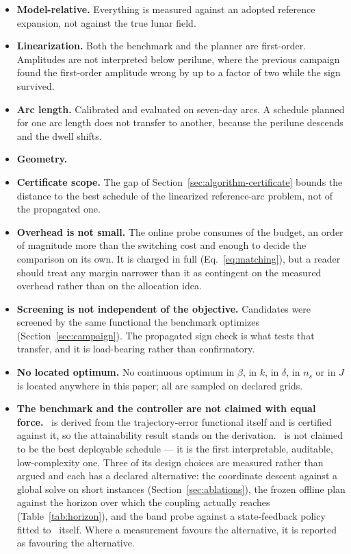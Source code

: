 \begin{itemize}
  \item \textbf{Model-relative.} Everything is measured against an adopted
    reference expansion, not against the true lunar field.
  \item \textbf{Linearization.} Both the benchmark and the planner are
    first-order. Amplitudes are not interpreted below  perilune, where
    the previous campaign found the first-order amplitude wrong by up to a
    factor of two while the sign survived.
  \item \textbf{Arc length.} Calibrated and evaluated on seven-day arcs.
     A schedule planned for one arc length
    does not transfer to another, because the perilune descends and the dwell
    shifts.
  \item \textbf{Geometry.} 
  \item \textbf{Certificate scope.} The gap of
    Section~\ref{sec:algorithm-certificate} bounds the distance to the best
    schedule of the linearized reference-arc problem, not of the propagated
    one.
  \item \textbf{Overhead is not small.} The online probe consumes  of
    the budget, an order of magnitude more than the switching cost and enough
    to decide the comparison on its own. It is charged in full
    (Eq.~\eqref{eq:matching}), but a reader should treat any margin narrower
    than it as contingent on the measured overhead rather than on the
    allocation idea.
  \item \textbf{Screening is not independent of the objective.} Candidates were
    screened by the same functional the benchmark optimizes
    (Section~\ref{sec:campaign}). The propagated sign check is what tests that
    transfer, and it is load-bearing rather than confirmatory.
  \item \textbf{No located optimum.} No continuous optimum in $\beta$, in $k$,
    in $\delta$, in $n_s$ or in $J$ is located anywhere in this paper; all are
    sampled on declared grids.
  \item \textbf{The benchmark and the controller are not claimed with equal
    force.} \Asign\ is derived from the trajectory-error functional itself and
    is certified against it, so the attainability result stands on the
    derivation. \Cplan\ is not claimed to be the best deployable schedule ---
    it is the first interpretable, auditable, low-complexity one. Three of its
    design choices are measured rather than argued and each has a declared
    alternative: the coordinate descent against a global solve on short
    instances (Section~\ref{sec:ablations}), the frozen offline plan against
    the horizon over which the coupling actually reaches
    (Table~\ref{tab:horizon}), and the band probe against a state-feedback
    policy fitted to \Asign\ itself. Where a measurement favours the
    alternative, it is reported as favouring the alternative.
\end{itemize}

